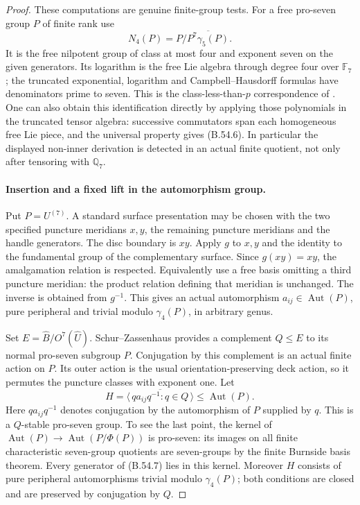 \begin{proof}
These computations are genuine finite-group tests. For a
free pro-seven group $P$ of finite rank use
\[
       N_4(P)=P/\overline{P^7\gamma_5(P)}.                 \tag{B.54.6}
\]
It is the free nilpotent group of class at most four and
exponent seven on the given generators. Its logarithm is
the free Lie algebra through degree four over
$\mathbb F_7$; the truncated exponential, logarithm and
Campbell--Hausdorff formulas have denominators prime to
seven. This is the class-less-than-$p$ correspondence of
\cite[II, \S4, Theorems 4.2--4.3 and Lemma 4.5]{CELazard1954}.
One can also obtain this identification directly by
applying those polynomials in the truncated tensor algebra:
successive commutators span each homogeneous free Lie
piece, and the universal property gives (B.54.6).
In particular the displayed non-inner derivation is
detected in an actual finite quotient, not only after
tensoring with $\mathbb Q_7$.

\paragraph{Insertion and a fixed lift in the automorphism group.}
Put $P=U^{(7)}$. A standard surface presentation may be
chosen with the two specified puncture meridians $x,y$,
the remaining puncture meridians and the handle generators.
The disc boundary is $xy$. Apply $g$ to $x,y$ and the
identity to the fundamental group of the complementary
surface. Since $g(xy)=xy$, the amalgamation relation is
respected. Equivalently use a free basis omitting a third
puncture meridian: the product relation defining that
meridian is unchanged. The inverse is obtained from
$g^{-1}$. This gives an actual automorphism
$a_{ij}\in\operatorname{Aut}(P)$, pure peripheral and
trivial modulo $\gamma_4(P)$, in arbitrary genus.

Set $E=\widehat B/O^7(\widehat U)$. Schur--Zassenhaus
provides a complement $Q\leq E$ to its normal pro-seven
subgroup $P$. Conjugation by this complement is an actual
finite action on $P$. Its outer action is the usual
orientation-preserving deck action, so it permutes the
puncture classes with exponent one.
Let
\[
 H=\overline{\langle\,q a_{ij}q^{-1}:q\in Q\,\rangle}
                          \leq\operatorname{Aut}(P).      \tag{B.54.7}
\]
Here $q a_{ij}q^{-1}$ denotes conjugation by the
automorphism of $P$ supplied by $q$.
This is a $Q$-stable pro-seven group. To see the last
point, the kernel of
$\operatorname{Aut}(P)\to\operatorname{Aut}(P/\Phi(P))$
is pro-seven: its images on all finite characteristic
seven-group quotients are seven-groups by the finite
Burnside basis theorem. Every generator of (B.54.7) lies
in this kernel. Moreover $H$ consists of pure peripheral
automorphisms trivial modulo $\gamma_4(P)$; both conditions
are closed and are preserved by conjugation by $Q$.


\end{proof}
